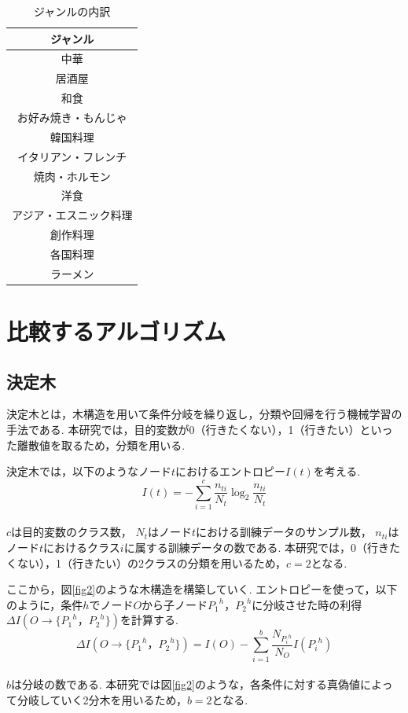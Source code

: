 \documentclass[12pt,a4j]{jreport}
\begin{document}
\begin{table}[htbp]
  \begin{center}
    \begin{tabular}{|c|}\hline
      \textbf{ジャンル} \\ \hline
      中華 \\ \hline
      居酒屋  \\ \hline
      和食 \\ \hline
      お好み焼き・もんじゃ \\ \hline
      韓国料理  \\ \hline
      イタリアン・フレンチ \\ \hline
      焼肉・ホルモン  \\ \hline
      洋食　\\ \hline
      アジア・エスニック料理 \\ \hline
      創作料理 \\ \hline
      各国料理 \\ \hline
      ラーメン \\ \hline
    \end{tabular}
  \end{center}
  \caption{ジャンルの内訳}
  \label{tab:genre}
\end{table}

\section{比較するアルゴリズム\cite{e}}

\subsection{決定木}
決定木とは，木構造を用いて条件分岐を繰り返し，分類や回帰を行う機械学習の手法である.
本研究では，目的変数が0（行きたくない），1（行きたい）といった離散値を取るため，分類を用いる.

決定木では，以下のようなノード\( t \)におけるエントロピー\( I(t) \)を考える.\\
\[
I(t) = - \sum_{i=1}^{c} \frac{n_{ti}}{N_t} \log_2 \frac{n_{ti}}{N_t}
\]\\
\( c \)は目的変数のクラス数，
\( N_t \)はノード\( t \)における訓練データのサンプル数，
\( n_{ti} \)はノード\( t \)におけるクラス\( i \)に属する訓練データの数である.
本研究では，0（行きたくない），1（行きたい）の2クラスの分類を用いるため，\( c = 2\)となる.

ここから，図\ref{fig2}のような木構造を構築していく.
エントロピーを使って，以下のように，条件\( h \)でノード\( O \)から子ノード\( {P_1}^h \)，\( {P_2}^h \)に分岐させた時の利得\( \Delta I(O→\{{P_1}^h，{P_2}^h\}) \)を計算する.\\
\[
  \Delta I(O→\{{P_1}^h，{P_2}^h\}) = I(O) - \sum_{i=1}^{b} \frac{N_{{P_i}^h}}{N_O} I({P_i}^h)
\]\\
\( b \)は分岐の数である.
本研究では図\ref{fig2}のような，各条件に対する真偽値によって分岐していく2分木を用いるため，\( b = 2\)となる.
\end{document}
